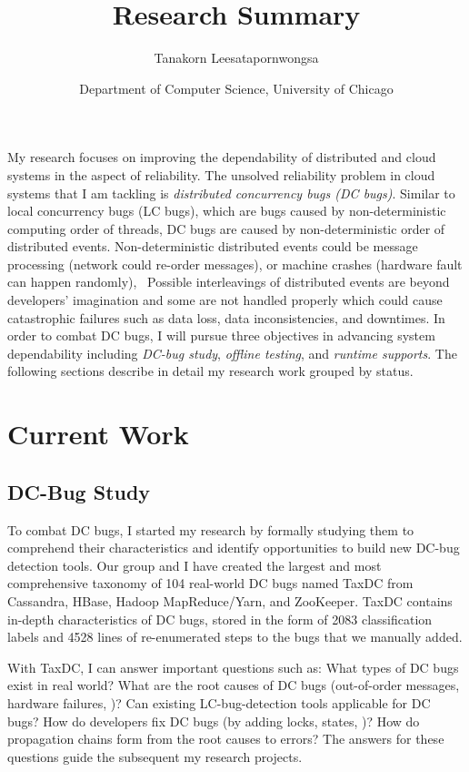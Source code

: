 \documentclass[11pt]{article}
\begin{document}
\title{Research Summary}
\author{Tanakorn Leesatapornwongsa}
\date{\vspace{-1ex} \small{Department of Computer Science, University of
Chicago}}

\maketitle

My research focuses on improving the dependability of distributed and cloud
systems in the aspect of reliability. The unsolved reliability problem in cloud
systems that I am tackling is \textit{distributed concurrency bugs (DC bugs)}.
Similar to local concurrency bugs (LC bugs), which are bugs caused by
non-deterministic computing order of threads, DC bugs are caused by
non-deterministic order of distributed events. Non-deterministic distributed
events could be message processing (network could re-order messages), or
machine crashes (hardware fault can happen randomly), \etc\ Possible
interleavings of distributed events are beyond developers' imagination and
some are not handled properly which could cause catastrophic failures such as
data loss, data inconsistencies, and downtimes. In order to combat DC bugs,
I will pursue three objectives in advancing system dependability including
\textit{DC-bug study}, \textit{offline testing}, and \textit{runtime supports}.
The following sections describe in detail my research work grouped by status.

\section*{Current Work}

\subsection{DC-Bug Study}

To combat DC bugs, I started my research by formally studying them to
comprehend their characteristics and identify opportunities to build new DC-bug
detection tools. Our group and I have created the largest and most
comprehensive taxonomy of 104 real-world DC bugs named TaxDC from Cassandra,
HBase, Hadoop MapReduce/Yarn, and ZooKeeper. TaxDC contains in-depth
characteristics of DC bugs, stored in the form of 2083 classification labels
and 4528 lines of re-enumerated steps to the bugs that we manually added. 

With TaxDC, I can answer important questions such as: What types of DC bugs
exist in real world? What are the root causes of DC bugs (out-of-order
messages, hardware failures, \etc)? Can existing LC-bug-detection tools
applicable for DC bugs? How do developers fix DC bugs (by adding locks, states,
\etc)? How do propagation chains form from the root causes to errors? The
answers for these questions guide the subsequent my research projects.
\end{document}
